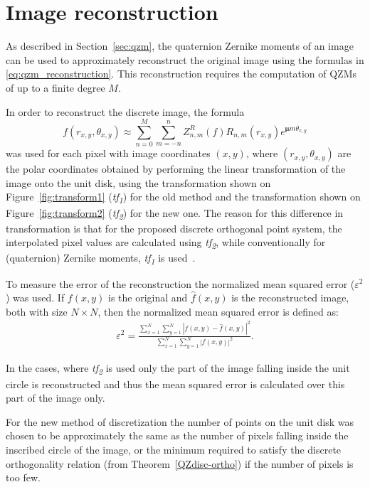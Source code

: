 \section{Image reconstruction}
As described in Section~\ref{sec:qzm}, the quaternion Zernike moments of an image can be used to approximately reconstruct the original image using the formulas in \eqref{eq:qzm_reconstruction}. This reconstruction requires the computation of QZMs of up to a finite degree $M$.

In order to reconstruct the discrete image, the formula 
$$
f(r_{x,y},\theta_{x,y}) \approx \sum_{n=0}^{M}\sum_{m=-n}^{n}Z_{n,m}^R(f)R_{n,m}(r_{x,y})e^{\bm{\mu}m\theta_{x,y}}
$$
was used for each pixel with image coordinates $(x,y)$, where $(r_{x,y},\theta_{x,y})$ are the polar coordinates obtained by performing the linear transformation of the image onto the unit disk, using the transformation shown on Figure~\ref{fig:transform1} (\textit{tf\textsubscript{1}}) for the old method and the transformation shown on Figure~\ref{fig:transform2} (\textit{tf\textsubscript{2}}) for the new one. The reason for this difference in transformation is that for the proposed discrete orthogonal point system, the interpolated pixel values are calculated using \textit{tf\textsubscript{2}}, while conventionally for (quaternion) Zernike moments, \textit{tf\textsubscript{1}} is used~\cite{qzmi}.

To measure the error of the reconstruction the normalized mean squared error ($\varepsilon^2$) was used. If $f(x,y)$ is the original and $\widehat{f}(x,y)$ is the reconstructed image, both with size $N \times N$, then the normalized mean squared error is defined as:
\begin{gather*}
    \varepsilon^2 = \frac{\displaystyle \sum_{x=1}^N\sum_{y=1}^N \left|f(x,y) - \widehat{f}(x,y)\right|^2}{\displaystyle \sum_{x=1}^N\sum_{y=1}^N \left|f(x,y)\right|^2}.
\end{gather*}

In the cases, where \textit{tf\textsubscript{2}} is used only the part of the image falling inside the unit circle is reconstructed and thus the mean squared error is calculated over this part of the image only.

For the new method of discretization the number of points on the unit disk was chosen to be approximately the same as the number of pixels falling inside the inscribed circle of the image, or the minimum required to satisfy the discrete orthogonality relation (from Theorem~\ref{QZdisc-ortho}) if the number of pixels is too few. 


